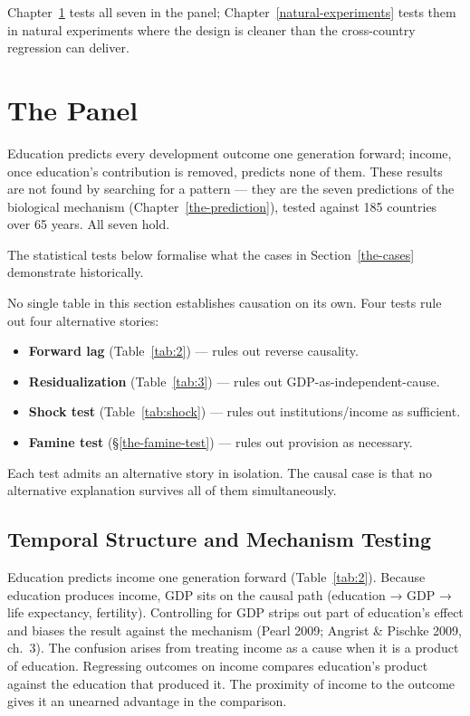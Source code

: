 \documentclass[12pt,letterpaper]{article}
\begin{document}
Chapter~\ref{the-panel} tests all seven in the panel; Chapter~\ref{natural-experiments} tests them in natural experiments where the design is cleaner than the cross-country regression can deliver.


\section{The Panel}\label{the-panel}

Education predicts every development outcome one generation forward; income, once education's contribution is removed, predicts none of them. These results are not found by searching for a pattern --- they are the seven predictions of the biological mechanism (Chapter~\ref{the-prediction}), tested against 185 countries over 65 years. All seven hold.

The statistical tests below formalise what the cases in Section~\ref{the-cases} demonstrate historically.

No single table in this section establishes causation on its own. Four
tests rule out four alternative stories:

\begin{itemize}
\item \textbf{Forward lag} (Table~\ref{tab:2}) --- rules out reverse causality.
\item \textbf{Residualization} (Table~\ref{tab:3}) --- rules out GDP-as-independent-cause.
\item \textbf{Shock test} (Table~\ref{tab:shock}) --- rules out institutions/income as sufficient.
\item \textbf{Famine test} (§\ref{the-famine-test}) --- rules out provision as necessary.
\end{itemize}

Each test admits an alternative story in isolation. The causal case is
that no alternative explanation survives all of them simultaneously.

\subsection{Temporal Structure and Mechanism Testing}\label{causal-identification-the-bad-control-problem-and-natural-experiments}

Education predicts income one generation forward (Table~\ref{tab:2}). Because education produces income, GDP sits on the causal path (education → GDP → life expectancy, fertility). Controlling for GDP strips out part of education's effect and biases the result against the mechanism (Pearl 2009; Angrist \& Pischke 2009, ch.~3). The confusion arises from treating income as a cause when it is a product of education. Regressing outcomes on income compares education's product against the education that produced it. The proximity of income to the outcome gives it an unearned advantage in the comparison.
\end{document}
